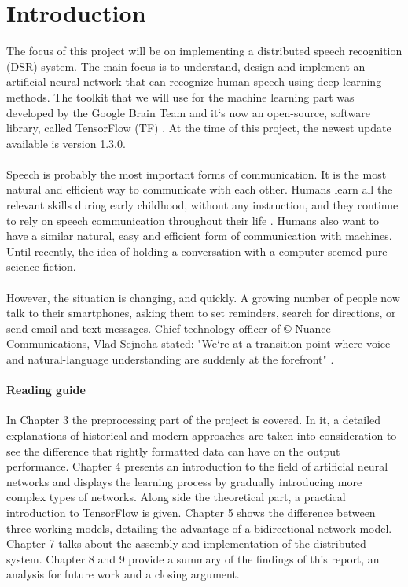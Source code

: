 \chapter{Introduction}\label{ch:introduction}

The focus of this project will be on implementing a distributed speech recognition (DSR) system.
The main focus is to understand, design and implement an artificial neural network that can recognize human speech using deep learning methods.
The toolkit that we will use for the machine learning part was developed by the Google Brain Team and it`s now an open-source, software library, called TensorFlow (TF) \cite{tensorflow2015-whitepaper}.
At the time of this project, the newest update available is version 1.3.0.\\\\
Speech is probably the most important forms of communication.
It is the most natural and efficient way to communicate with
each other. Humans learn all the relevant skills during early
childhood, without any instruction, and they continue to rely
on speech communication throughout their life \cite{kamblespeech}.
Humans also want to have a similar natural, easy and efficient form of communication with machines. 
Until recently, the idea of holding a conversation with a computer seemed pure science fiction.\\\\
However, the situation is changing, and quickly.
A growing number of people now talk to their smartphones, asking them to set reminders, search for directions, or send email and text messages.
Chief technology officer of \copyright{} Nuance Communications, Vlad Sejnoha stated: "We`re at a transition point where voice and natural-language understanding are suddenly at the forefront" \cite{kamblespeech}.\\

\subsubsection{Reading guide}

In Chapter 3 the preprocessing part of the project is covered. In it, a detailed explanations of historical and modern approaches are taken into consideration to see the difference that rightly formatted data can have on the output performance.
Chapter 4 presents an introduction to the field of artificial neural networks and displays the learning process by gradually introducing more complex types of networks. Along side the theoretical part, a practical introduction to TensorFlow is given. Chapter 5 shows the difference between three working models, detailing the advantage of a bidirectional network model. Chapter 7 talks about the assembly and implementation of the distributed system. Chapter 8 and 9 provide a summary of the findings of this report, an analysis for future work and a closing argument. 